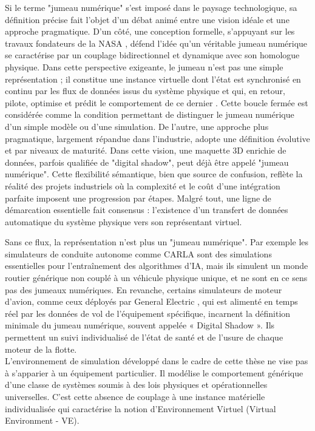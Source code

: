 Si le terme "jumeau numérique" s'est imposé dans le paysage technologique, sa définition précise fait l'objet d'un débat animé entre une vision idéale et une approche pragmatique. D'un côté, une conception formelle, s'appuyant sur les travaux fondateurs de la NASA \cite{grieves_digital_2014}, défend l'idée qu'un véritable jumeau numérique se caractérise par un couplage bidirectionnel et dynamique avec son homologue physique. Dans cette perspective exigeante, le jumeau n'est pas une simple représentation ; il constitue une instance virtuelle dont l'état est synchronisé en continu par les flux de données issus du système physique et qui, en retour, pilote, optimise et prédit le comportement de ce dernier \cite{negri_review_2017}. Cette boucle fermée est considérée comme la condition permettant de distinguer le jumeau numérique d'un simple modèle ou d'une simulation. De l'autre, une approche plus pragmatique, largement répandue dans l'industrie, adopte une définition évolutive et par niveaux de maturité. Dans cette vision, une maquette 3D enrichie de données, parfois qualifiée de "digital shadow", peut déjà être appelé "jumeau numérique". Cette flexibilité sémantique, bien que source de confusion, reflète la réalité des projets industriels où la complexité et le coût d'une intégration parfaite imposent une progression par étapes. Malgré tout, une ligne de démarcation essentielle fait consensus : l'existence d'un transfert de données automatique du système physique vers son représentant virtuel. 

Sans ce flux, la représentation n'est plus un "jumeau numérique". Par exemple les simulateurs de conduite autonome comme CARLA \cite{dosovitskiy_carla_2017} sont des simulations essentielles pour l'entraînement des algorithmes d'IA, mais ils simulent un monde routier générique non couplé à un véhicule physique unique, et ne sont en ce sens pas des jumeaux numériques. En revanche, certains simulateurs de moteur d'avion, comme ceux déployés par General Electric \cite{tao_digital_2018}, qui est alimenté en temps réel par les données de vol de l'équipement spécifique, incarnent la définition minimale du jumeau numérique, souvent appelée « Digital Shadow ». Ils permettent un suivi individualisé de l'état de santé et de l'usure de chaque moteur de la flotte.\\

L'environnement de simulation développé dans le cadre de cette thèse ne vise pas à s'apparier à un équipement particulier. Il modélise le comportement générique d'une classe de systèmes soumis à des lois physiques et opérationnelles universelles. C'est cette absence de couplage à une instance matérielle individualisée qui caractérise la notion d'Environnement Virtuel (Virtual Environment - VE).

